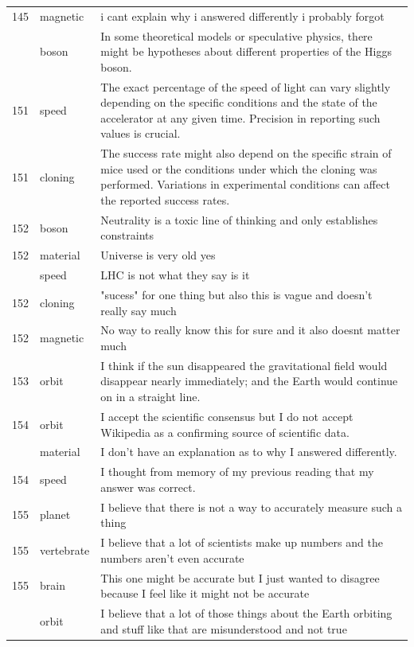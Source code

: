 \documentclass[
  doc,floatsintext]{apa6}
\begin{document}
\begin{longtable}[t]{>{}r>{}l>{\raggedright\arraybackslash}p{30em}}
145 & magnetic & i cant explain why i answered differently i probably forgot\\
\addlinespace
151 & boson & In some theoretical models or speculative physics, there might be hypotheses about different properties of the Higgs boson.\\
151 & speed & The exact percentage of the speed of light can vary slightly depending on the specific conditions and the state of the accelerator at any given time. Precision in reporting such values is crucial.\\
151 & cloning & The success rate might also depend on the specific strain of mice used or the conditions under which the cloning was performed. Variations in experimental conditions can affect the reported success rates.\\
152 & boson & Neutrality is a toxic line of thinking and only establishes constraints\\
152 & material & Universe is very old yes\\
\addlinespace
152 & speed & LHC is not what they say is it\\
152 & cloning & "sucess" for one thing but also this is vague and doesn't really say much\\
152 & magnetic & No way to really know this for sure and it also doesnt matter much\\
153 & orbit & I think if the sun disappeared the gravitational field would disappear nearly immediately; and the Earth would continue on in a straight line.\\
154 & orbit & I accept the scientific consensus but I do not accept Wikipedia as a confirming source of scientific data.\\
\addlinespace
154 & material & I don't have an explanation as to why I answered differently.\\
154 & speed & I thought from memory of my previous reading that my answer was correct.\\
155 & planet & I believe that there is not a way to accurately measure such a thing\\
155 & vertebrate & I believe that a lot of scientists make up numbers and the numbers aren't even accurate\\
155 & brain & This one might be accurate but I just wanted to disagree because I feel like it might not be accurate\\
\addlinespace
155 & orbit & I believe that a lot of those things about the Earth orbiting and stuff like that are misunderstood and not true\\

\end{longtable}
\end{document}
